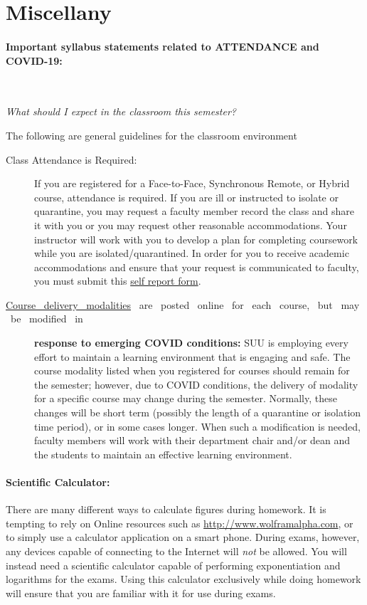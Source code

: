 \documentclass[12pt, letterpaper]{article}
\begin{document}
\section*{Miscellany}

\paragraph{Important syllabus statements related to ATTENDANCE and COVID-19:} ~

\noindent\emph{What should I expect in the classroom this semester?}

\noindent The following are general guidelines for the classroom environment
\begin{description}
	\item[Class Attendance is Required:] If you are registered for a Face-to-Face, Synchronous Remote, or Hybrid course, attendance is required. If you are ill or instructed to isolate or quarantine, you may request a faculty member record the class and share it with you or you may request other reasonable accommodations. Your instructor will work with you to develop a plan for completing coursework while you are isolated/quarantined. In order for you to receive academic accommodations and ensure that your request is communicated to faculty, you must submit this \href{https://my.suu.edu/covid/selfreport/}{self report form}.
	\item[\href{https://www.suu.edu/registrar/onlinehybrid.html}{Course ~delivery ~modalities} ~are ~posted ~online ~for ~each ~course, ~but ~may ~be ~modified ~in] \textbf{response to emerging COVID conditions:} SUU is employing every effort to maintain a learning environment that is engaging and safe. The course modality listed when you registered for courses should remain for the semester; however, due to COVID conditions, the delivery of modality for a specific course may change during the semester. Normally, these changes will be short term (possibly the length of a quarantine or isolation time period), or in some cases longer. When such a modification is needed, faculty members will work with their department chair and/or dean and the students to maintain an effective learning environment.
\end{description}

\paragraph{Scientific Calculator:}
There are many different ways to calculate figures during homework. It is tempting to rely on Online resources such as \href{http://www.wolframalpha.com}{http://www.wolframalpha.com}, or to simply use a calculator application on a smart phone. During exams, however, any devices capable of connecting to the Internet will \emph{not} be allowed. You will instead need a scientific calculator capable of performing exponentiation and logarithms for the exams. Using this calculator exclusively while doing homework will ensure that you are familiar with it for use during exams.
\end{document}

